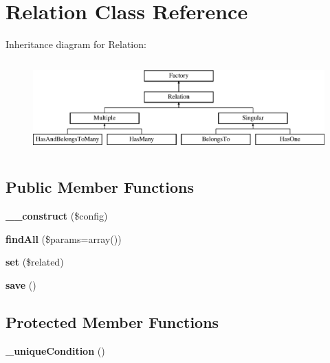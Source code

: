 \hypertarget{classRelation}{
\section{Relation Class Reference}
\label{classRelation}
}
Inheritance diagram for Relation:\begin{figure}[H]
\begin{center}
\leavevmode
\includegraphics[height=3.589744cm]{classRelation}
\end{center}
\end{figure}
\subsection*{Public Member Functions}
\begin{DoxyCompactItemize}
\item 
\hypertarget{classRelation_a6b1911e012187cea5d7c091102be0a50}{
{\bfseries \_\-\_\-construct} (\$config)}
\label{classRelation_a6b1911e012187cea5d7c091102be0a50}

\item 
\hypertarget{classRelation_aaa13d5054864000bfc5cce7005c4faa0}{
{\bfseries findAll} (\$params=array())}
\label{classRelation_aaa13d5054864000bfc5cce7005c4faa0}

\item 
\hypertarget{classRelation_a13266a68ba6e908f64fce390002a466c}{
{\bfseries set} (\$related)}
\label{classRelation_a13266a68ba6e908f64fce390002a466c}

\item 
\hypertarget{classRelation_a80d3c27e3d7ec74c6fee75baf47c4a86}{
{\bfseries save} ()}
\label{classRelation_a80d3c27e3d7ec74c6fee75baf47c4a86}

\end{DoxyCompactItemize}
\subsection*{Protected Member Functions}
\begin{DoxyCompactItemize}
\item 
\hypertarget{classRelation_a9116a79fccbc91e1339c5e9826fe3100}{
{\bfseries \_\-uniqueCondition} ()}
\label{classRelation_a9116a79fccbc91e1339c5e9826fe3100}

\end{DoxyCompactItemize}
